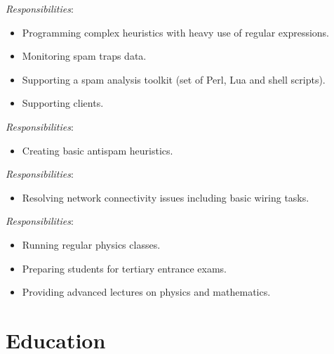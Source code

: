\documentclass[11pt,a4paper,sans]{moderncv}        %
\newcommand{\responsibilities}[1]{ \emph{Responsibilities}:\begin{itemize} #1\end{itemize}}
\begin{document}
 {
    \responsibilities {
        \item Programming complex heuristics with heavy use of regular expressions.
        \item Monitoring spam traps data.
        \item Supporting a spam analysis toolkit (set of Perl, Lua and shell scripts).
        \item Supporting clients.
    }
}

 {
    \responsibilities {
        \item Creating basic antispam heuristics.
    }
}

 {
    \responsibilities {
        \item Resolving network connectivity issues including basic wiring tasks.
    }
}

 {
    \responsibilities {
        \item Running regular physics classes.
        \item Preparing students for tertiary entrance exams.
        \item Providing advanced lectures on physics and mathematics.
    }
}


\section{Education}
\end{document}
